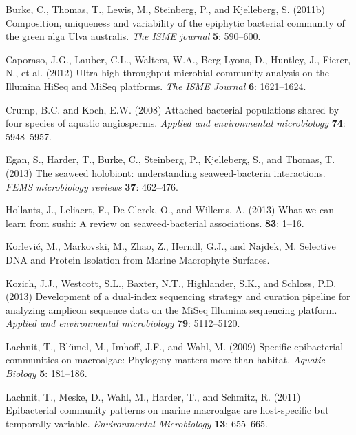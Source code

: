 \documentclass[12pt,]{article}
\begin{document}
\leavevmode\hypertarget{ref-Burke2011b}{}%
Burke, C., Thomas, T., Lewis, M., Steinberg, P., and Kjelleberg, S.
(2011b) Composition, uniqueness and variability of the epiphytic
bacterial community of the green alga Ulva australis. \emph{The ISME
journal} \textbf{5}: 590--600.

\leavevmode\hypertarget{ref-Caporaso2012}{}%
Caporaso, J.G., Lauber, C.L., Walters, W.A., Berg-Lyons, D., Huntley,
J., Fierer, N., et al. (2012) Ultra-high-throughput microbial community
analysis on the Illumina HiSeq and MiSeq platforms. \emph{The ISME
Journal} \textbf{6}: 1621--1624.

\leavevmode\hypertarget{ref-Crump2008}{}%
Crump, B.C. and Koch, E.W. (2008) Attached bacterial populations shared
by four species of aquatic angiosperms. \emph{Applied and environmental
microbiology} \textbf{74}: 5948--5957.

\leavevmode\hypertarget{ref-Egan2013}{}%
Egan, S., Harder, T., Burke, C., Steinberg, P., Kjelleberg, S., and
Thomas, T. (2013) The seaweed holobiont: understanding seaweed-bacteria
interactions. \emph{FEMS microbiology reviews} \textbf{37}: 462--476.

\leavevmode\hypertarget{ref-Hollants2013}{}%
Hollants, J., Leliaert, F., De Clerck, O., and Willems, A. (2013) What
we can learn from sushi: A review on seaweed-bacterial associations.
\textbf{83}: 1--16.

\leavevmode\hypertarget{ref-Korlevic_in_press}{}%
Korlević, M., Markovski, M., Zhao, Z., Herndl, G.J., and Najdek, M.
Selective DNA and Protein Isolation from Marine Macrophyte Surfaces.

\leavevmode\hypertarget{ref-Kozich2013}{}%
Kozich, J.J., Westcott, S.L., Baxter, N.T., Highlander, S.K., and
Schloss, P.D. (2013) Development of a dual-index sequencing strategy and
curation pipeline for analyzing amplicon sequence data on the MiSeq
Illumina sequencing platform. \emph{Applied and environmental
microbiology} \textbf{79}: 5112--5120.

\leavevmode\hypertarget{ref-Lachnit2009}{}%
Lachnit, T., Blümel, M., Imhoff, J.F., and Wahl, M. (2009) Specific
epibacterial communities on macroalgae: Phylogeny matters more than
habitat. \emph{Aquatic Biology} \textbf{5}: 181--186.

\leavevmode\hypertarget{ref-Lachnit2011}{}%
Lachnit, T., Meske, D., Wahl, M., Harder, T., and Schmitz, R. (2011)
Epibacterial community patterns on marine macroalgae are host-specific
but temporally variable. \emph{Environmental Microbiology} \textbf{13}:
655--665.
\end{document}
